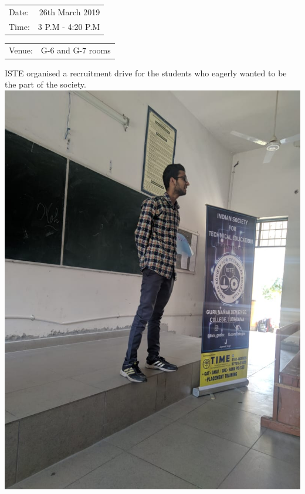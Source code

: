 \documentclass[12pt, a4 paper]{article}
\begin{document}
\begin{center}
\begin{multicols}{2}
\begin{tabular}{l r}
Date: & 26th March 2019 \\ %
Time: & 3 P.M - 4:20 P.M \\ %
\end{tabular}
\columnbreak
\begin{tabular}{l r}
Venue: & G-6 and G-7 rooms \\ %
\end{tabular}
\end{multicols}

\begin{Large}
\begin{multicols}{2}
ISTE organised a recruitment drive for the students who eagerly wanted to be the part of the society.
\columnbreak
\includegraphics[width=\linewidth]{image2.jpg}
\end{multicols}


\end{Large}
\end{center}
\end{document}
